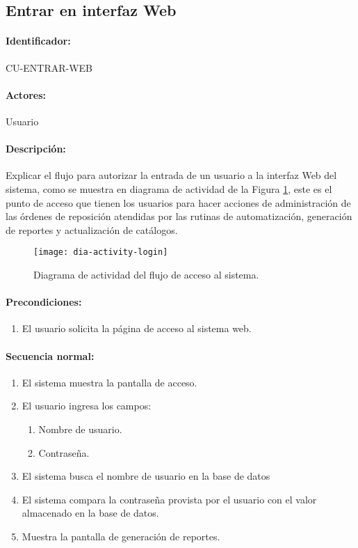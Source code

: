 \subsection{Entrar en interfaz Web}\label{cu-entrar-web}
\paragraph{Identificador:}
CU-ENTRAR-WEB
\paragraph{Actores:}
Usuario
\paragraph{Descripción:}
Explicar el flujo para autorizar la entrada de un usuario a la interfaz Web del sistema, como se muestra en diagrama de actividad de la Figura \ref{fig:dia-activity-login}, este es el punto de acceso que tienen los usuarios para hacer acciones de administración de las órdenes de reposición atendidas por las rutinas de automatización, generación de reportes y actualización de catálogos.
\begin{figure}[h]
  \centering
  \texttt{[image: dia-activity-login]}
  \caption{Diagrama de actividad del flujo de acceso al sistema.}
  \label{fig:dia-activity-login}
\end{figure}
\paragraph{Precondiciones:}
\begin{enumerate}
  \item El usuario solicita la página de acceso al sistema web.
\end{enumerate}
\paragraph{Secuencia normal:}
\begin{enumerate}
  \item El sistema muestra la pantalla de acceso.
  \item El usuario ingresa los campos:
  \begin{enumerate}
    \item Nombre de usuario.
    \item Contraseña.
  \end{enumerate}
  \item El sistema busca el nombre de usuario en la base de datos
  \item El sistema compara la contraseña provista por el usuario con el valor almacenado en la base de datos.
  \item Muestra la pantalla de generación de reportes.
\end{enumerate}
